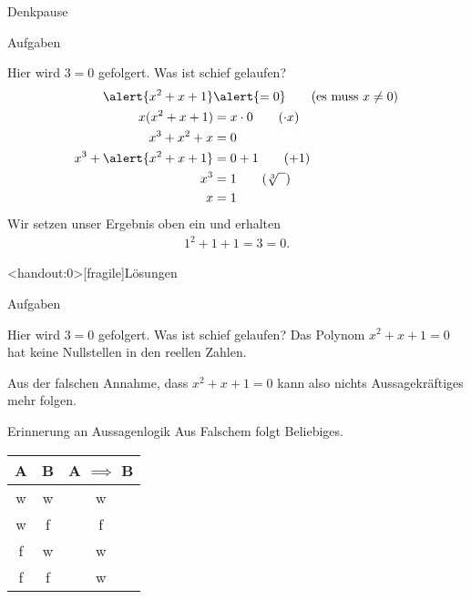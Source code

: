 
{
	\begin{frame}[fragile]{Denkpause}
		\begin{alertblock}{Aufgaben}
		\small{
			\begin{block}{Hier wird $3=0$ gefolgert. Was ist schief gelaufen?}
				\begin{align*}
					\alert{x^2 + x + 1} &\alert{= 0} \tag{es muss $x\neq0$}\\
					x(x^2 + x + 1) &= x \cdot 0 \tag{$\cdot x$}\\
					x^3 + x^2 + x &= 0\\
					x^3 + \alert{x^2 + x + 1} &= 0 + 1\tag{$+ 1$}\\
					x^3 &= 1\tag{$\sqrt[3]{\phantom{x}}$}\\
					x &= 1
				\end{align*}
				Wir setzen unser Ergebnis oben ein und erhalten
				\begin{align*}
					1^2 + 1 + 1= 3 = 0\text{.}
				\end{align*}
			\end{block}
		}
		\end{alertblock}
	\end{frame}
}

{
	\begin{frame}<handout:0>[fragile]{Lösungen}
		\begin{alertblock}{Aufgaben}
		\small{
			\begin{block}{Hier wird $3=0$ gefolgert. Was ist schief gelaufen?}
				Das Polynom $x^2 + x + 1 = 0$ hat keine Nullstellen in den reellen Zahlen.
				
				Aus der falschen Annahme, dass $x^2 + x + 1 = 0$ kann also nichts Aussagekräftiges mehr folgen.
			\end{block}
			\begin{alertblock}{Erinnerung an Aussagenlogik}
				Aus Falschem folgt Beliebiges.\\
				\begin{table}
					\begin{tabular}{ccc}
						\toprule
						A & B & A $\implies$ B \\
						\midrule
						w & w & w \\
						w & f & f \\
						\alert{f} & \alert{w} & \alert{w} \\
						\alert{f} & \alert{f} & \alert{w} \\
						\bottomrule
					\end{tabular}
				\end{table}
			\end{alertblock}
		}
		\end{alertblock}
	\end{frame}
}